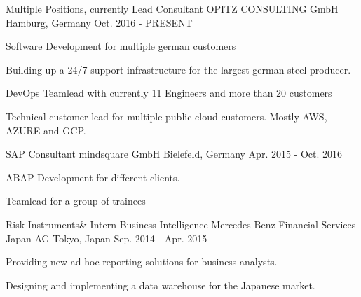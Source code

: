 

\begin{cventries}

  \cventry
    {Multiple Positions, currently Lead Consultant} %
    {OPITZ CONSULTING GmbH} %
    {Hamburg, Germany} %
    {Oct. 2016 - PRESENT} %
    {
      \begin{cvitems}
        \item {Software Development for multiple german customers}
        \item {Building up a 24/7 support infrastructure for the largest german steel producer.}
        \item {DevOps Teamlead with currently 11 Engineers and more than 20 customers}
        \item {Technical customer lead for multiple public cloud customers. Mostly AWS, AZURE and GCP.}
      \end{cvitems}
    }

\cventry
{SAP Consultant} %
{mindsquare GmbH} %
{Bielefeld, Germany} %
{Apr. 2015 - Oct. 2016} %
{
  \begin{cvitems}
    \item {ABAP Development for different clients. }
    \item {Teamlead for a group of trainees }
  \end{cvitems}
}

  \cventry
    {Risk Instruments\& Intern Business Intelligence} %
    {Mercedes Benz Financial Services Japan AG} %
    {Tokyo, Japan} %
    {Sep. 2014 - Apr. 2015} %
    {
      \begin{cvitems} %
        \item {Providing new ad-hoc reporting solutions for business analysts.}
        \item {Designing and implementing a data warehouse for the Japanese market.}
      \end{cvitems}
    }


\end{cventries}

